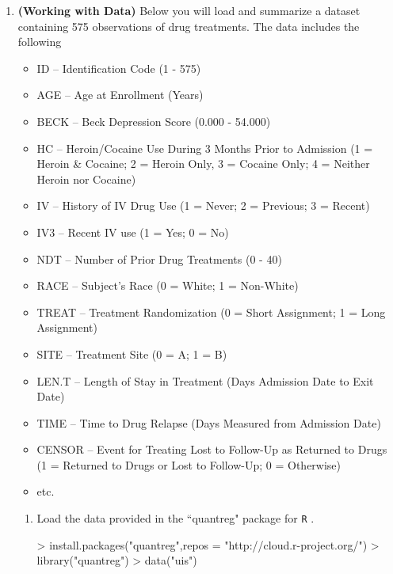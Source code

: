 \documentclass{article}
\begin{document}
\begin{enumerate}
  \item \textbf{(Working with Data)} Below you will load and summarize a dataset 
  containing 575 observations of drug treatments. The data includes the following
  \begin{itemize}
    \item ID --	Identification Code	(1 - 575)
    \item AGE	-- Age at Enrollment	(Years)
    \item BECK -- Beck Depression Score	(0.000 - 54.000)
    \item HC --	Heroin/Cocaine Use During	3 Months Prior to Admission (1 = Heroin
    \& Cocaine; 2 = Heroin Only, 3 = Cocaine Only; 4 = Neither Heroin nor Cocaine)
    \item IV -- History of IV Drug Use	(1 = Never; 2 = Previous; 3 = Recent)
    \item IV3	-- Recent IV use	(1 = Yes; 0 = No)
    \item NDT -- Number of Prior Drug Treatments (0 - 40)
    \item RACE -- Subject's Race	(0 = White; 1 = Non-White)
    \item TREAT -- Treatment Randomization (0 = Short Assignment;	1 = Long Assignment)
    \item SITE -- Treatment Site (0 = A; 1 = B)
    \item LEN.T	-- Length of Stay in Treatment (Days Admission Date to Exit Date)	
    \item TIME -- Time to Drug Relapse (Days Measured from Admission Date)
    \item CENSOR -- Event for Treating Lost to Follow-Up as Returned to Drugs 
    (1 = Returned to Drugs or Lost to Follow-Up; 0 = Otherwise)
    \item etc.
  \end{itemize}
  \begin{enumerate} %
    \item Load the data provided in the ``quantreg" package for \texttt{R} \citep{quantreg}.
\begin{Schunk}
\begin{Sinput}
> install.packages("quantreg",repos = "http://cloud.r-project.org/")
> library("quantreg")
> data("uis")
\end{Sinput}
\end{Schunk}


\end{enumerate}
\end{enumerate}
\end{document}
